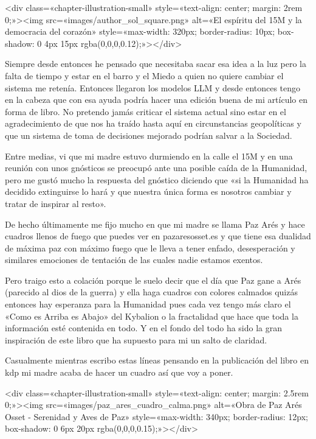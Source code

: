 \documentclass[12pt,twoside,openany]{book}
\begin{document}
<div class=«chapter-illustration-small» style=«text-align: center; margin: 2rem 0;»><img src=«images/author_sol_square.png» alt=«El espíritu del 15M y la democracia del corazón» style=«max-width: 320px; border-radius: 10px; box-shadow: 0 4px 15px rgba(0,0,0,0.12);»></div>

Siempre desde entonces he pensado que necesitaba sacar esa idea a la luz pero la falta de tiempo y estar en el barro y el Miedo a quien no quiere cambiar el sistema me retenía. Entonces llegaron los modelos LLM y desde entonces tengo en la cabeza que con esa ayuda podría hacer una edición buena de mi artículo en forma de libro. No pretendo jamás criticar el sistema actual sino estar en el agradecimiento de que nos ha traído hasta aquí en circunstancias geopolíticas y que un sistema de toma de decisiones mejorado podrían salvar a la Sociedad.

Entre medias, vi que mi madre estuvo durmiendo en la calle el 15M y en una reunión con unos gnósticos se preocupó ante una posible caída de la Humanidad, pero me gustó mucho la respuesta del gnóstico diciendo que «si la Humanidad ha decidido extinguirse lo hará y que nuestra única forma es nosotros cambiar y tratar de inspirar al resto». 

De hecho últimamente me fijo mucho en que mi madre se llama Paz Arés y hace cuadros llenos de fuego que puedes ver en pazaresosset.es y que tiene esa dualidad de máxima paz con máximo fuego que le lleva a tener enfado, desesperación y similares emociones de tentación de las cuales nadie estamos exentos.

Pero traigo esto a colación porque le suelo decir que el día que Paz gane a Arés (parecido al dios de la guerra) y ella haga cuadros con colores calmados quizás entonces hay esperanza para la Humanidad pues cada vez tengo más claro el «Como es Arriba es Abajo» del Kybalion o la fractalidad que hace que toda la información esté contenida en todo. Y en el fondo del todo ha sido la gran inspiración de este libro que ha supuesto para mi un salto de claridad.

Casualmente mientras escribo estas líneas pensando en la publicación del libro en kdp mi madre acaba de hacer un cuadro así que voy a poner.

<div class=«chapter-illustration-small» style=«text-align: center; margin: 2.5rem 0;»><img src=«images/paz_ares_cuadro_calma.png» alt=«Obra de Paz Arés Osset - Serenidad y Aves de Paz» style=«max-width: 340px; border-radius: 12px; box-shadow: 0 6px 20px rgba(0,0,0,0.15);»></div>
\end{document}
